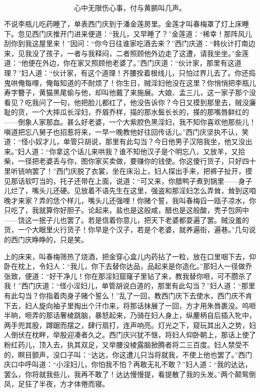 \[
心中无限伤心事，付与黄鹂叫几声。
\]

不说李瓶儿吃药睡了，单表西门庆到于潘金莲房里。金莲才叫春梅罩了灯上床睡下。忽见西门庆推开门进来便道：“我儿，又早睡了？”金莲道：“稀幸！那阵风儿刮你到我这屋里来！”因问：“你今日往谁家吃酒去来？”西门庆道：“韩伙计打南边来，见我没了孩子，一者与我释闷，二者照顾他外边走了这遭，请我坐坐。”金莲道：“他便在外边，你在家又照顾他老婆了。”西门庆道：“伙计家，那里有这道理？”妇人道：“伙计家，有这个道理！齐腰拴着根线儿，只怕过界儿去了。你还捣鬼哄俺每哩，俺每知道的不耐烦了！你生日，贼淫妇他没在这里？你悄悄把李瓶儿寿字簪子，黄猫黑尾偷与他，却叫他戴了来施展。大娘、孟三儿，这一家子那个没看见？吃我问了一句，他把脸儿都红了，他没告诉你？今日又摸到那里去，贼没廉耻的货，一个大摔瓜长淫妇，乔眉乔样，描的那水鬓长长的，搽的那嘴唇鲜红的——倒象人家那血\textMaoBi 。甚么好老婆，一个大紫腔色黑淫妇，我不知你喜欢他那些儿！嗔道把忘八舅子也招惹将来，一早一晚教他好往回传话儿。”西门庆坚执不认，笑道：“怪小奴才儿，单管只胡说，那里有此勾当？今日他男子汉陪我坐，他又没出来。”妇人道：“你拿这个话儿来哄我？谁不知他汉子是个明忘八，又放羊，又拾柴，一径把老婆丢与你，图你家买卖做，要赚你的钱使。你这傻行货子，只好四十里听铳响罢了！”西门庆脱了衣裳，坐在床沿上，妇人探出手来，把裤子扯开，摸见那话软叮当的，托子还带在上面，说道：“可又来，你腊鸭子煮到锅里——身子儿烂了，嘴头儿还硬。见放着不语先生在这里，强盗和那淫妇怎么弄耸，耸到这咱晚才来家？弄的恁个样儿，嘴头儿还强哩！你赌个誓，我叫春梅舀一瓯子凉水，你只吃了，我就算你好胆子。论起来，盐也是这般咸，醋也是这般酸，秃子包网中——饶这一抿子儿也罢了。若是信着你意儿，把天下老婆都耍遍了罢。贼没羞的货，一个大眼里火行货子！你早是个汉子，若是个老婆，就养遍街，遍巷。”几句说的西门庆睁睁的，只是笑。

上的床来，叫春梅筛热了烧酒，把金穿心盒儿内药拈了一粒，放在口里咽下去，仰卧在枕上，令妇人：“我儿，你下去替你达品，品起来是你造化。”那妇人一径做乔张致，便道：“好干净儿！你在那淫妇窟窿子里钻了来，教我替你咂，可不臜杀了我！”西门庆道：“怪小淫妇儿，单管胡说白道的，那里有此勾当？”妇人道：“那里有此勾当？你指着肉身子赌个誓么！”乱了一回，教西门庆下去使水，西门庆不肯下去，妇人旋向袖子里掏出个汗巾来，将那话抹展了一回，方才用朱唇裹没。呜咂半晌，咂弄的那话奢棱跳脑，暴怒起来，乃骑在妇人身上，纵麈柄自后插入牝中，两手兜其股，蹲踞而摆之，肆行扇打，连声响亮。灯光之下，窥玩其出入之势，妇人倒伏在枕畔，举股迎凑者久之。西门庆兴犹不惬，将妇人仰卧朝上，那话上使了粉红药儿，顶入去，执其双足，又举腰没棱露脑掀腾者将二三百度。妇人禁受不的，瞑目颤声，没口子叫：“达达，你这遭儿只当将就我，不使上他也罢了。”西门庆口中呼叫道：“小淫妇儿，你怕我不怕？再敢无礼不敢？”妇人道：“我的达达，罢么，你将就我些儿，我再不敢了！达达慢慢提，看提散了我的头发。”两个颠鸳倒凤，足狂了半夜，方才体倦而寝。


